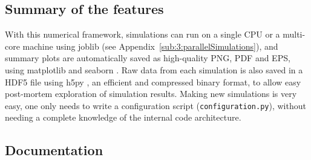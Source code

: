 \begin{small}
    \inputminted[linenos=true,numbersep=5pt,frame=lines,framesep=2mm]{python3}{2-Chapters/3-Chapter/src/example_of_a_IndexPolicy_UCB.py}
\end{small}


\subsection{Summary of the features}

With this numerical framework, simulations can run on a single CPU or a multi-core machine using joblib \cite{joblib} (see Appendix~\ref{sub:3:parallelSimulations}),
and summary plots are automatically saved as high-quality PNG, PDF and EPS, using matplotlib \cite{matplotlib} and seaborn \cite{seaborn}.
Raw data from each simulation is also saved in a HDF5 file using h5py \cite{h5py}, an efficient and compressed binary format, to allow easy post-mortem exploration of simulation results.
Making new simulations is very easy, one only needs to write a configuration script (\texttt{configuration.py}), without needing a complete knowledge of the internal code architecture.


\subsection{Documentation}

